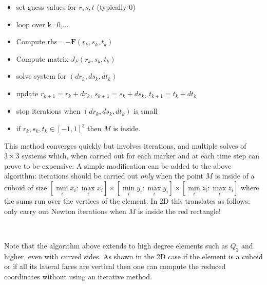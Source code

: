 \begin{itemize}
\item set guess values for $r,s,t$ (typically 0)
\item loop over k=0,...
\item Compute rhs= $-{\bm F}(r_k,s_k,t_k)$ 
\item Compute matrix $J_F(r_k,s_k,t_k)$
\item solve system for $(dr_k,ds_k,dt_k)$
\item update $r_{k+1}=r_k+dr_k$, $s_{k+1}=s_k+ds_k$, $t_{k+1}=t_k+dt_k$ 
\item stop iterations when $(dr_k,ds_k,dt_k)$ is small
\item if $r_k,s_k,t_k\in[-1,1]^3$ then $M$ is inside.
\end{itemize}
This method converges quickly but involves iterations, and multiple 
solves of $3\times 3$ systems which, when carried out for each marker 
and at each time step can prove to be expensive. 
A simple modification can be added to the above algorithm: 
iterations should be carried out {\it only}
when the point $M$ is inside of a cuboid of 
size $[\min\limits_i{x_i}:\max\limits_i{x_i}]\times[\min\limits_i{y_i}:\max\limits_i{y_i} ]
\times[\min\limits_i{z_i}:\max\limits_i{z_i}]$ where the sums run over the vertices of the element. 
In 2D this translates as follows: only carry out Newton iterations when $M$ is inside the red rectangle!
\begin{center}
\\
\end{center}

Note that the algorithm above extends to high degree elements 
such as $Q_2$ and higher, even with curved sides.
As shown in the 2D case if the element is a cuboid or 
if all its lateral faces are vertical then one can 
compute the reduced coordinates without using an iterative method.



